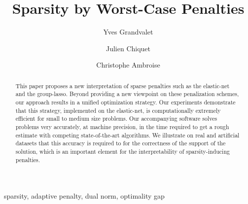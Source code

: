 \documentclass[review,authoryear]{elsarticle}
\begin{document}
\begin{frontmatter}





\title{Sparsity by Worst-Case Penalties}

\author[label1]{Yves Grandvalet}
\author[label2]{Julien Chiquet}
\author[label3]{Christophe Ambroise}
\address[label1]{Sorbonne universit\'es, Universit\'e de technologie de Compi\`egne, CNRS, \\ Heudiasyc UMR 7253, CS 60 319, 60 203 Compi\`egne cedex, France}
\address[label2]{AgroParisTech, INRA, Universit\'e Paris-Saclay\\UMR MIA-Paris, 16 rue Claude Bernard, 75005, Paris, France}
\address[label3]{Universit\'e d'\'Evry Val d'Essonne, Universit\'e Paris-Saclay,  ENSIIE, USC INRA\\ UMR CNRS 8071, LaMME, 91000 \'Evry, France}

\begin{abstract}%
  This paper proposes a new interpretation of sparse penalties such as
  the elastic-net and the group-lasso.  Beyond providing a new
  viewpoint on these penalization schemes, our approach results in a
  unified optimization strategy.  Our experiments
  demonstrate that this strategy, implemented on the elastic-net, is
  computationally extremely efficient for small to medium size
  problems.  Our accompanying software solves problems very accurately, at machine
  precision, in the time required to get a rough estimate with
  competing state-of-the-art algorithms. 
  We illustrate on real and artificial datasets that this accuracy is required to 
  for the correctness of the support of the solution, which is an important element 
  for the interpretability of sparsity-inducing penalties. 
\end{abstract} 

\begin{keyword}
  sparsity, adaptive penalty, dual norm, optimality gap
\end{keyword}

\end{frontmatter}
\end{document}
